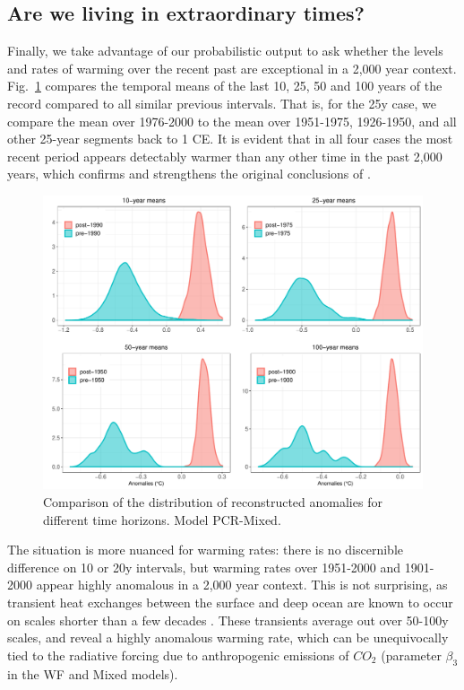 \documentclass[12pt]{amsart}
\theoremstyle{plain}
\theoremstyle{definition}
\theoremstyle{remark}
\newcommand{\lb}[1]{\color{MidnightBlue}\textbf{[LB: #1]}\normalcolor}
\newcommand{\jeg}[1]{\color{ProcessBlue}\textbf{[JEG: #1]}\normalcolor}
\begin{document}
\subsection{Are we living in extraordinary times?}


Finally, we take advantage of our probabilistic output to ask whether the levels and rates of warming over the recent past are exceptional in a 2,000 year context.  Fig.~\ref{fig:compmeans} compares the temporal means of the last 10, 25, 50 and 100 years of the record compared to all similar previous intervals. That is, for the 25y case, we compare the mean over 1976-2000 to the mean over 1951-1975, 1926-1950, and all other 25-year segments back to 1 CE. It is evident that in all four cases the most recent period appears detectably warmer than any other time in the past 2,000 years, which confirms and strengthens the original conclusions of \cite{MBH99}.  

\begin{figure}
  \centering
  \includegraphics[scale=0.35]{compMeans}
  \caption{Comparison of the distribution of reconstructed anomalies for different time horizons. Model PCR-Mixed. }
  \label{fig:compmeans}
\end{figure}

The situation is more nuanced for warming rates: there is no discernible difference on 10 or 20y intervals, but warming rates over 1951-2000 and 1901-2000 appear highly anomalous in a 2,000 year context. This is not surprising, as transient heat exchanges between the surface and deep ocean are known to occur on scales shorter than a few decades \citep{Hansen:2005}. These transients average out over 50-100y scales, and reveal a highly anomalous warming rate, which can be unequivocally tied to the radiative forcing due to anthropogenic emissions of $CO_2$ (parameter $\beta_3$ in the WF and Mixed models).
\end{document}
